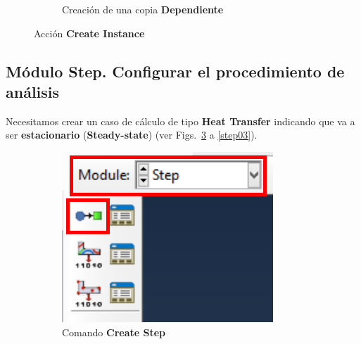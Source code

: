 \begin{figure}[!h]
\begin{subfigure}[!h]{0.39\textwidth}
      \caption{Creación de una copia \textbf{Dependiente}}
      \label{asse02}
    \end{subfigure}%
    \caption{Acción \textbf{Create Instance}}
  \end{figure}

  \subsection{Módulo Step. Configurar el procedimiento de análisis}

  Necesitamos crear un caso de cálculo de tipo \textbf{Heat Transfer}
  indicando que va a ser \textbf{estacionario} (\textbf{Steady-state})
  (ver Figs.~\ref{step01} a \ref{step03}).


  \begin{figure}[!h]
    \centering
    \begin{subfigure}[!h]{0.20\textwidth}
      \includegraphics[width=\textwidth]{./body/images/step01.pdf}
      \caption{Comando \textbf{Create Step}}
      \label{step01}
    \end{subfigure}%
    ~
    \begin{subfigure}[!h]{0.39\textwidth}

\end{subfigure}
\end{figure}
